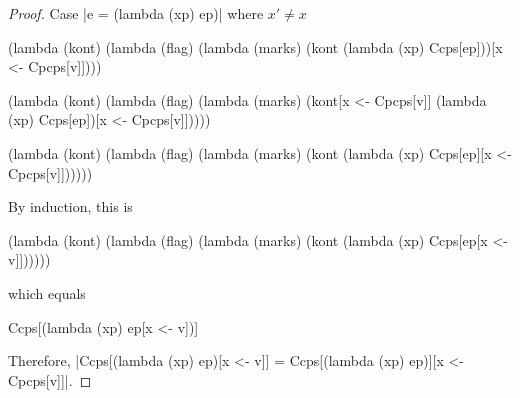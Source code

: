 \begin{proof}{Case \scheme|e = (lambda (xp) ep)| where $x'\ne x$}
\begin{schemeblock}
\begin{schemedisplay}
(lambda (kont)
  (lambda (flag)
    (lambda (marks)
      (kont (lambda (xp) Ccps[ep]))[x <- Cpcps[v]])))
\end{schemedisplay}
\end{schemeblock}

\begin{schemeblock}
\begin{schemedisplay}
(lambda (kont)
  (lambda (flag)
    (lambda (marks)
      (kont[x <- Cpcps[v]] (lambda (xp) Ccps[ep])[x <- Cpcps[v]]))))
\end{schemedisplay}
\end{schemeblock}

\begin{schemeblock}
\begin{schemedisplay}
(lambda (kont)
  (lambda (flag)
    (lambda (marks)
      (kont (lambda (xp) Ccps[ep][x <- Cpcps[v]])))))
\end{schemedisplay}
\end{schemeblock}

By induction, this is
\begin{schemeblock}
\begin{schemedisplay}
(lambda (kont)
  (lambda (flag)
    (lambda (marks)
      (kont (lambda (xp) Ccps[ep[x <- v]])))))
\end{schemedisplay}
\end{schemeblock}
which equals
\begin{schemeblock}
\begin{schemedisplay}
Ccps[(lambda (xp) ep[x <- v])]
\end{schemedisplay}
\end{schemeblock}

Therefore, \scheme|Ccps[(lambda (xp) ep)[x <- v]] = Ccps[(lambda (xp) ep)][x <- Cpcps[v]]|.
\end{proof}

